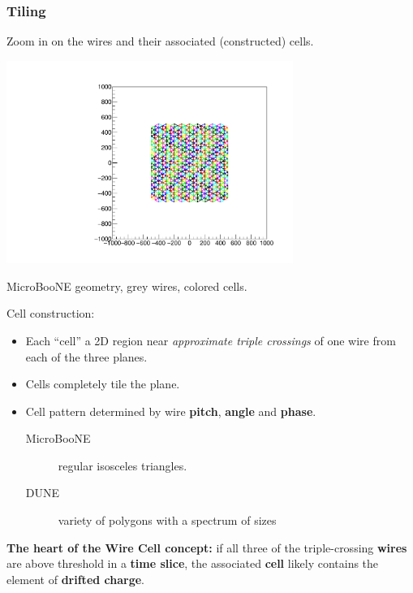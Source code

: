 \begin{frame}[fragile]
  \frametitle{Tiling}

  \vspace{-10mm}

  \begin{center}
    \scriptsize Zoom in on the wires and their associated (constructed) cells.

    \includegraphics[width=0.7\textwidth,trim=8.6cm 10cm 8.6cm 9cm,clip]{test_boundcells_uboone.pdf}

    MicroBooNE geometry, grey wires, colored cells.
  \end{center}

  \footnotesize
  Cell construction:
  \begin{itemize}
  \item Each ``cell'' a 2D region near \textit{approximate triple crossings} of one wire from each of the three planes.
  \item Cells completely tile the plane.
  \item Cell pattern determined by wire \textbf{pitch}, \textbf{angle} and \textbf{phase}.
    \begin{description}
    \item[MicroBooNE] regular isosceles triangles.
    \item[DUNE] variety of polygons with a spectrum of sizes
    \end{description}
  \end{itemize}

  \textbf{The heart of the Wire Cell concept:} if all three of the
  triple-crossing \textbf{wires} are above threshold in a \textbf{time
    slice}, the associated \textbf{cell} likely contains the element
  of \textbf{drifted charge}.

\end{frame}

